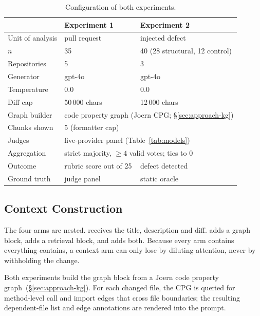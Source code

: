 \begin{table}[htbp]
    \centering
    \caption{Configuration of both experiments.}
    \label{tab:config}
    \small
    \begin{tabular}{lll}
        \toprule
                          & Experiment 1        & Experiment 2 \\
        \midrule
        Unit of analysis  & pull request & injected defect \\
        $n$               & 35                  & 40 (28 structural, 12 control) \\
        Repositories      & 5                   & 3 \\
        Generator         & gpt-4o              & gpt-4o \\
        Temperature       & 0.0                 & 0.0 \\
        Diff cap          & 50\,000 chars       & 12\,000 chars \\
        Graph builder     & \multicolumn{2}{l}{code property graph (Joern CPG; \S\ref{sec:approach-kg})} \\
        Chunks shown      & \multicolumn{2}{l}{5 (formatter cap)} \\
        Judges            & \multicolumn{2}{l}{five-provider panel (Table~\ref{tab:models})} \\
        Aggregation       & \multicolumn{2}{l}{strict majority, $\geq 4$ valid votes; ties to 0} \\
        Outcome           & rubric score out of 25 & defect detected \\
        Ground truth      & judge panel         & static oracle \\
        \bottomrule
    \end{tabular}
\end{table}

\subsection{Context Construction}
\label{sec:context-construction}

The four arms are nested. \baseline{} receives the title, description and
diff. \kg{} adds a graph block, \rag{} adds a
retrieval block, and \hybrid{} adds both. Because every arm contains
everything \baseline{} contains, a context arm can only lose by diluting
attention, never by withholding the change.

Both experiments build the graph block from a Joern code property
graph~(\S\ref{sec:approach-kg}). For each changed file, the CPG is
queried for method-level call and import edges that cross
file boundaries; the resulting dependent-file list and edge annotations are
rendered into the prompt.

